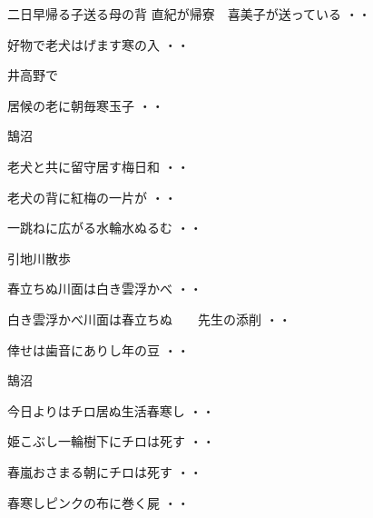 \begin{shiika}二日早帰る子送る母の背
\qquad\qquad\qquad \qquad 直紀が帰寮　喜美子が送っている
\hfill{・・}\end{shiika}
\begin{shiika}好物で老犬はげます寒の入
\hfill{・・}\end{shiika}
\vspace{0.4cm}
井高野で
\begin{shiika}居候の老に朝毎寒玉子
\hfill{・・}\end{shiika}
\vspace{0.4cm}
鵠沼
\begin{shiika}老犬と共に留守居す梅日和
\hfill{・・}\end{shiika}
\begin{shiika}老犬の背に紅梅の一片が
\hfill{・・}\end{shiika}
\begin{shiika}一跳ねに広がる水輪水ぬるむ
\hfill{・・}\end{shiika}
\qquad\qquad\qquad 引地川散歩
\begin{shiika}春立ちぬ川面は白き雲浮かべ
\hfill{・・}\end{shiika}
\begin{shiika}白き雲浮かべ川面は春立ちぬ　　先生の添削
\hfill{・・}\end{shiika}
\begin{shiika}倖せは歯音にありし年の豆
\hfill{・・}\end{shiika}
\vspace{0.4cm}
鵠沼
\begin{shiika}今日よりはチロ居ぬ生活春寒し
\hfill{・・}\end{shiika}
\begin{shiika}姫こぶし一輪樹下にチロは死す
\hfill{・・}\end{shiika}
\begin{shiika}春嵐おさまる朝にチロは死す
\hfill{・・}\end{shiika}
\begin{shiika}春寒しピンクの布に巻く屍
\hfill{・・}\end{shiika}
